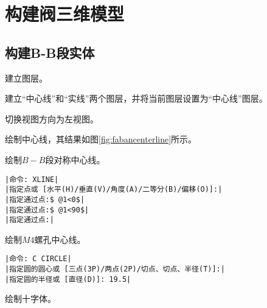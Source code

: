 \section{构建阀三维模型}
\subsection{构建B-B段实体}
\begin{procedure}
\item 建立图层。

建立“中心线”和“实线”两个图层，并将当前图层设置为“中心线”图层。
\item 切换视图方向为左视图。
\item 绘制中心线，其结果如图\ref{fig:fabancenterline}所示。

绘制$B-B$段对称中心线。
\begin{lstlisting}
|命令: XLINE|
|指定点或 [水平(H)/垂直(V)/角度(A)/二等分(B)/偏移(O)]:|
|指定通过点:$ @1<0$|
|指定通过点:$ @1<90$|
|指定通过点:|
\end{lstlisting}
绘制$M4$螺孔中心线。
\begin{lstlisting}
|命令: C CIRCLE|
|指定圆的圆心或 [三点(3P)/两点(2P)/切点、切点、半径(T)]:|
|指定圆的半径或 [直径(D)]: 19.5|
\end{lstlisting}
\begin{figure}[htbp]
\centering
\begin{floatrow}[3]
\end{floatrow}
\end{figure}
\item 绘制十字体。


\end{procedure}
